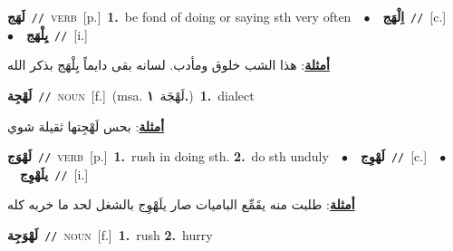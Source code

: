 \documentclass[10pt,a4paper,twoside]{article} %
\begin{document}
\begin{multicols}{2}
{\setlength\topsep{0pt}\textbf{\foreignlanguage{arabic}{لَهَج}}\ {\color{gray}\texttt{//}\color{black}}\ \textsc{verb}\ [p.]\ \textbf{1.}~be fond of doing or saying sth very often\ \ $\bullet$\ \ \setlength\topsep{0pt}\textbf{\foreignlanguage{arabic}{اِلْهَج}}\ {\color{gray}\texttt{//}\color{black}}\ [c.]\ \ $\bullet$\ \ \setlength\topsep{0pt}\textbf{\foreignlanguage{arabic}{يِلْهَج}}\ {\color{gray}\texttt{//}\color{black}}\ [i.]\  \begin{flushright}\color{gray}\foreignlanguage{arabic}{\textbf{\underline{\foreignlanguage{arabic}{أمثلة}}}: هذا الشب خلوق ومأدب. لسانه بقى دايماً يِلْهَج بذكر الله}\end{flushright}\color{black}} \vspace{2mm}

{\setlength\topsep{0pt}\textbf{\foreignlanguage{arabic}{لَهْجِة}}\ {\color{gray}\texttt{//}\color{black}}\ \textsc{noun}\ [f.]\ \color{gray}(msa. \foreignlanguage{arabic}{لَهْجَة}~\foreignlanguage{arabic}{\textbf{١.}})\color{black}\ \textbf{1.}~dialect\  \begin{flushright}\color{gray}\foreignlanguage{arabic}{\textbf{\underline{\foreignlanguage{arabic}{أمثلة}}}: بحس لَهْجِتها ثقيلة شوي}\end{flushright}\color{black}} \vspace{2mm}

{\setlength\topsep{0pt}\textbf{\foreignlanguage{arabic}{لَهْوَج}}\ {\color{gray}\texttt{//}\color{black}}\ \textsc{verb}\ [p.]\ \textbf{1.}~rush in doing sth.  \textbf{2.}~do sth unduly\ \ $\bullet$\ \ \setlength\topsep{0pt}\textbf{\foreignlanguage{arabic}{لَهْوِج}}\ {\color{gray}\texttt{//}\color{black}}\ [c.]\ \ $\bullet$\ \ \setlength\topsep{0pt}\textbf{\foreignlanguage{arabic}{يلَهْوِج}}\ {\color{gray}\texttt{//}\color{black}}\ [i.]\  \begin{flushright}\color{gray}\foreignlanguage{arabic}{\textbf{\underline{\foreignlanguage{arabic}{أمثلة}}}: طلبت منه يقَمِّع الباميات صار يلَهْوِج بالشغل لحد ما خربه كله}\end{flushright}\color{black}} \vspace{2mm}

{\setlength\topsep{0pt}\textbf{\foreignlanguage{arabic}{لَهْوَجِة}}\ {\color{gray}\texttt{//}\color{black}}\ \textsc{noun}\ [f.]\ \textbf{1.}~rush  \textbf{2.}~hurry\ } \vspace{2mm}


\end{multicols}
\end{document}
